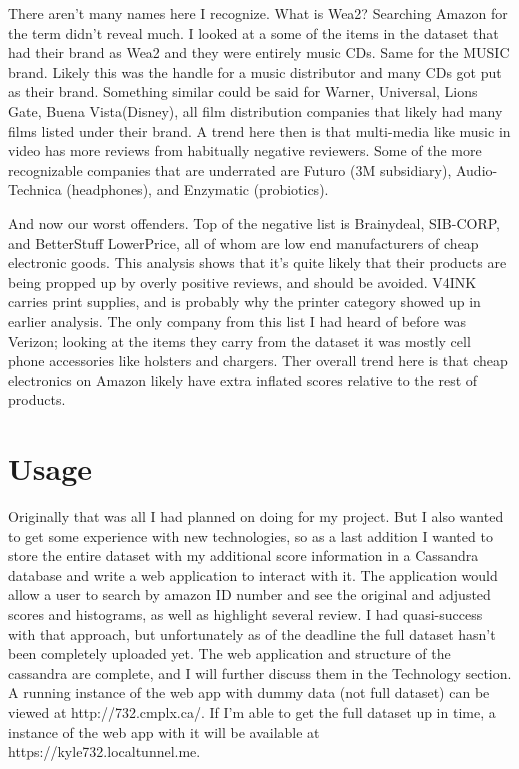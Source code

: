 \documentclass[a4paper,10pt]{article}
\begin{document}
There aren't many names here I recognize. What is Wea2? Searching Amazon for the term didn't reveal much. I looked at a some of the items in the dataset that had their brand as Wea2 and they were entirely music CDs. Same for the MUSIC brand. Likely this was the handle for a music distributor and many CDs got put as their brand. Something similar could be said for Warner, Universal, Lions Gate, Buena Vista(Disney), all film distribution companies that likely had many films listed under their brand. A trend here then is that multi-media like music in video has more reviews from habitually negative reviewers. Some of the more recognizable companies that are underrated are Futuro (3M subsidiary), Audio-Technica (headphones), and Enzymatic (probiotics). 

And now our worst offenders. Top of the negative list is Brainydeal, SIB-CORP, and BetterStuff LowerPrice, all of whom are low end manufacturers of cheap electronic goods. This analysis shows that it's quite likely that their products are being propped up by overly positive reviews, and should be avoided. V4INK carries print supplies, and is probably why the printer category showed up in earlier analysis. The only company from this list I had heard of before was Verizon; looking at the items they carry from the dataset it was mostly cell phone accessories like holsters and chargers. Ther overall trend here is that cheap electronics on Amazon likely have extra inflated scores relative to the rest of products.

\section*{Usage}
Originally that was all I had planned on doing for my project. But I also wanted to get some experience with new technologies, so as a last addition I wanted to store the entire dataset with my additional score information in a Cassandra database and write a web application to interact with it. The application would allow a user to search by amazon ID number and see the original and adjusted scores and histograms, as well as highlight several review. I had quasi-success with that approach, but unfortunately as of the deadline the full dataset hasn't been completely uploaded yet. The web application and structure of the cassandra are complete, and I will further discuss them in the Technology section. A running instance of the web app with dummy data (not full dataset) can be viewed at http://732.cmplx.ca/. If I'm able to get the full dataset up in time, a instance of the web app with it will be available at https://kyle732.localtunnel.me.
\end{document}
